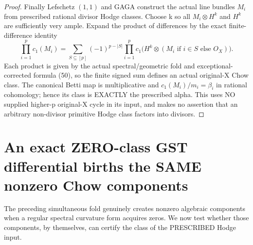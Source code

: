 \documentclass[11pt]{article}
\begin{document}
\begin{proof}
Finally Lefschetz $(1,1)$ and GAGA
construct the actual line bundles
$M_i$ from prescribed rational
divisor Hodge classes.
Choose k so all $M_i\otimes H^k$
and $H^k$ are sufficiently very
ample. Expand the product of
differences by the exact
finite-difference identity
\[
 \prod_{i=1}^p c_1(M_i)
 =\sum_{S\subseteq[p]}(-1)^{p-|S|}
   \prod_{i=1}^p
    c_1\big(H^k\otimes
        (M_i\text{ if }i\in S
           \text{ else }O_X)\big).
\]
Each product is given by the
actual spectral/geometric fold
and exceptional-corrected formula
(50), so the finite signed sum
defines an actual original-X
Chow class. The canonical Betti
map is multiplicative and
$c_1(M_i)/m_i=\beta_i$ in rational
cohomology; hence its class is
EXACTLY the prescribed alpha.
This uses NO supplied higher-p
original-X cycle in its input,
and makes no assertion that an
arbitrary non-divisor primitive
Hodge class factors into divisors.
\end{proof}




\section{An exact ZERO-class GST differential births the SAME nonzero Chow components}
The preceding simultaneous fold genuinely creates
nonzero algebraic components when a regular
spectral curvature form acquires zeros.
We now test whether those components, by themselves,
can certify the class of the PRESCRIBED Hodge input.
\end{document}
